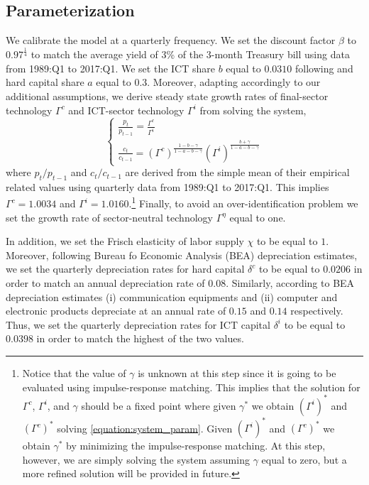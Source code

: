 \documentclass[12pt]{article}
\begin{document}
\subsection{Parameterization}\label{section:parameterization}

We calibrate the model at a quarterly frequency. We set the discount factor $\beta$ to $0.97^{\frac{1}{4}}$ to match the average yield of $3$\% of the 3-month Treasury bill using data from 1989:Q1 to 2017:Q1. We set the ICT share $b$ equal to $0.0310$ following \cite{oulton2012long} and hard capital share $a$ equal to $0.3$. Moreover, adapting \cite{oulton2012long} accordingly to our additional assumptions, we derive steady state growth rates of final-sector technology $\Gamma^c$ and ICT-sector technology $\Gamma^i$ from solving the system,
\begin{equation}\label{equation:system_param}
\begin{cases}
 \frac{p_t}{p_{t-1}}  = \frac{\Gamma^c}{\Gamma^i} \\
 \frac{c_t}{c_{t-1}}  = (\Gamma^c)^{\frac{1-b-\gamma}{1-a-b-\gamma}}  (\Gamma^i)^{\frac{b+\gamma}{1-a-b-\gamma}}
\end{cases}
\end{equation}
where $p_t/p_{t-1}$ and $c_t/c_{t-1}$ are derived from the simple mean of their empirical related values using quarterly data from 1989:Q1 to 2017:Q1. This implies $\Gamma^c = 1.0034$ and $\Gamma^i = 1.0160$.\footnote{Notice that the value of $\gamma$ is unknown at this step since it is going to be evaluated using impulse-response matching. This implies that the solution for $\Gamma^c$, $\Gamma^i$, and $\gamma$ should be a fixed point where given $\gamma^*$ we obtain $(\Gamma^i)^*$ and $(\Gamma^c)^*$ solving \ref{equation:system_param}. Given $(\Gamma^i)^*$ and $(\Gamma^c)^*$ we obtain $\gamma^*$ by minimizing the impulse-response matching. At this step, however, we are simply solving the system assuming $\gamma$ equal to zero, but a more refined solution will be provided in future.} Finally, to avoid an over-identification problem we set the growth rate of sector-neutral technology $\Gamma^{\eta}$ equal to one.

In addition, we set the Frisch elasticity of labor supply $\chi$ to be equal to $1$. Moreover, following Bureau fo Economic Analysis (BEA) depreciation estimates, we set the quarterly depreciation rates for hard capital $\delta^c$ to be equal to $0.0206$ in order to match an annual depreciation rate of $0.08$. Similarly, according to BEA depreciation estimates (i) communication equipments and (ii) computer and electronic products depreciate at an annual rate of $0.15$ and $0.14$ respectively. Thus, we set the quarterly depreciation rates for ICT capital $\delta^i$ to be equal to $0.0398$ in order to match the highest of the two values.
\end{document}
